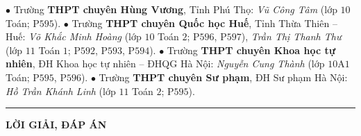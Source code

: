 \begin{multicols}{2}
	\vskip 0.05cm
	$\bullet$ Trường \textbf{\color{thachthuctoanhoc}THPT chuyên Hùng Vương}, Tỉnh Phú Thọ: \textit{Vũ Công Tâm} (lớp $10$ Toán; P$595$).
	\vskip 0.05cm
	$\bullet$ Trường \textbf{\color{thachthuctoanhoc}THPT chuyên Quốc học Huế}, Tỉnh Thừa Thiên -- Huế: \textit{Võ Khắc Minh Hoàng} (lớp $10$ Toán $2$; P$596$, P$597$), \textit{Trần Thị Thanh Thư} (lớp $11$ Toán $1$; P$592$, P$593$, P$594$).
	\vskip 0.05cm
	$\bullet$ Trường \textbf{\color{thachthuctoanhoc}THPT chuyên Khoa học tự nhiên}, ĐH Khoa học tự nhiên -- ĐHQG Hà Nội: \textit{Nguyễn Cung Thành} (lớp $10$A$1$ Toán; P$595$, P$596$).
	\vskip 0.05cm
	$\bullet$ Trường \textbf{\color{thachthuctoanhoc}THPT chuyên Sư phạm}, ĐH Sư phạm Hà Nội: \textit{Hồ Trần Khánh Linh} (lớp $11$ Toán $2$; P$595$).
\end{multicols}
\vspace*{-10pt}
\rule{1\linewidth}{0.1pt}
\begin{center}
	\textbf{\LARGE\color{thachthuctoanhoc}LỜI GIẢI, ĐÁP ÁN}
\end{center}

